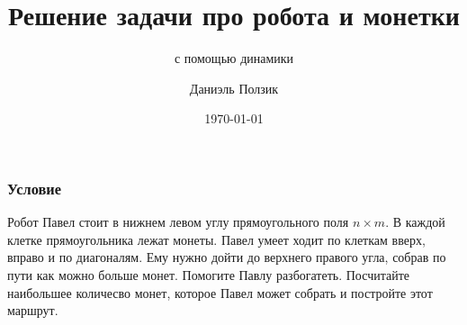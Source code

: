 \documentclass[handout]{beamer}
\title{Решение задачи про робота и монетки}
\subtitle{с помощью динамики}
\author{Даниэль Ползик}
\date{\today}
\begin{document}
\begin{frame}

\titlepage

\end{frame}

\begin{frame}
  \transdissolve[duration=0.2]
  \frametitle{Условие}

\begin{block}{}
Робот Павел стоит в нижнем левом углу прямоугольного поля $n\times m$. В каждой клетке прямоугольника лежат монеты. Павел умеет ходит по клеткам вверх, вправо и по диагоналям. Ему нужно дойти до верхнего правого угла, собрав по пути как можно больше монет. Помогите Павлу разбогатеть.
Посчитайте наибольшее количесво монет, которое Павел может собрать и постройте этот маршрут. 

\end{block}


\end{frame}
\end{document}
